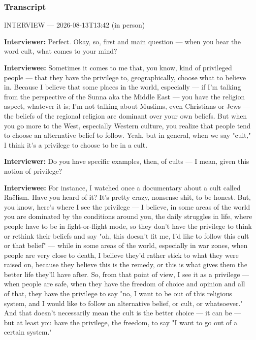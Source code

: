 \subsubsection*{Transcript}
INTERVIEW — 2026-08-13T13:42 (in person)

\textbf{Interviewer:} Perfect. Okay, so, first and main question — when you hear the word cult, what comes to your mind?

\textbf{Interviewee:} Sometimes it comes to me that, you know, kind of privileged people — that they have the privilege to, geographically, choose what to believe in. Because I believe that some places in the world, especially — if I'm talking from the perspective of the Sunna aka the Middle East — you have the religion aspect, whatever it is; I'm not talking about Muslims, even Christians or Jews — the beliefs of the regional religion are dominant over your own beliefs. But when you go more to the West, especially Western culture, you realize that people tend to choose an alternative belief to follow. Yeah, but in general, when we say "cult," I think it's a privilege to choose to be in a cult.

\textbf{Interviewer:} Do you have specific examples, then, of cults — I mean, given this notion of privilege?

\textbf{Interviewee:} For instance, I watched once a documentary about a cult called Raëlism. Have you heard of it? It's pretty crazy, nonsense shit, to be honest. But, you know, here's where I see the privilege — I believe, in some areas of the world you are dominated by the conditions around you, the daily struggles in life, where people have to be in fight-or-flight mode, so they don't have the privilege to think or rethink their beliefs and say "oh, this doesn't fit me, I'd like to follow this cult or that belief" — while in some areas of the world, especially in war zones, when people are very close to death, I believe they'd rather stick to what they were raised on, because they believe this is the remedy, or this is what gives them the better life they'll have after. So, from that point of view, I see it as a privilege — when people are safe, when they have the freedom of choice and opinion and all of that, they have the privilege to say "no, I want to be out of this religious system, and I would like to follow an alternative belief, or cult, or whatsoever." And that doesn't necessarily mean the cult is the better choice — it can be — but at least you have the privilege, the freedom, to say "I want to go out of a certain system."

